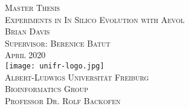 \begin{titlepage}
\begin{center}
	\vspace{6em}
	{\huge \textsc{Master Thesis}}\\
	\vspace{3em}
	{\huge \textsc{Experiments in In Silico Evolution with Aevol}}\\
	\vspace{3em}
	{\Large \textsc{Brian Davis}}\\
	\vspace{2em}
	{\Large \textsc{Supervisor: Berenice Batut}}\\
	\vspace{3em}
	{\Large \textsc{April 2020}}\\
	\vspace{5em}
	\texttt{[image: unifr-logo.jpg]}\\
	\vspace{3em}
	{\Large \textsc{Albert-Ludwigs Universität Freiburg}}\\
	\vspace{2em}
	{\Large \textsc{Bioinformatics Group}}\\
	\vspace{2em}
	{\Large \textsc{Professor Dr. Rolf Backofen}}\\
\end{center}
\end{titlepage}
